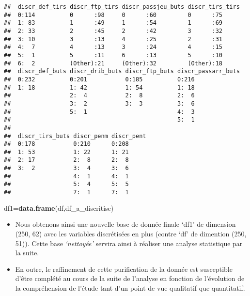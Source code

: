 \documentclass[7pt,]{report}
\newenvironment{Shaded}{\begin{snugshade}}{\end{snugshade}}
\newcommand{\KeywordTok}[1]{\textcolor[rgb]{0.13,0.29,0.53}{\textbf{#1}}}
\newcommand{\NormalTok}[1]{#1}
\begin{document}
\begin{verbatim}
##  discr_def_tirs discr_ftp_tirs discr_passjeu_buts discr_tirs_tirs
##  0:114          0      :98     0      :60         0      :75     
##  1: 83          1      :49     1      :54         1      :69     
##  2: 33          2      :45     2      :42         3      :32     
##  3: 10          3      :13     4      :25         2      :31     
##  4:  7          4      :13     3      :24         4      :15     
##  5:  1          5      :11     6      :13         5      :10     
##  6:  2          (Other):21     (Other):32         (Other):18     
##  discr_def_buts discr_drib_buts discr_ftp_buts discr_passarr_buts
##  0:232          0:201           0:185          0:216             
##  1: 18          1: 42           1: 54          1: 18             
##                 2:  4           2:  8          2:  6             
##                 3:  2           3:  3          3:  6             
##                 5:  1                          4:  3             
##                                                5:  1             
##                                                                  
##  discr_tirs_buts discr_penm discr_pent
##  0:178           0:210      0:208     
##  1: 53           1: 22      1: 21     
##  2: 17           2:  8      2:  8     
##  3:  2           3:  4      3:  6     
##                  4:  1      4:  1     
##                  5:  4      5:  5     
##                  7:  1      7:  1
\end{verbatim}

\begin{Shaded}
\begin{Highlighting}[]
\NormalTok{df1=}\KeywordTok{data.frame}\NormalTok{(df,df_a_discritise)}
\end{Highlighting}
\end{Shaded}

\begin{itemize}
\item
  Nous obtenons ainsi une nouvelle base de donnée finale `df1' de dimension (250, 62) avec les variables discrétisées en plus (contre `df' de dimention (250, 51)). Cette base \emph{`nettoyée'} servira ainsi à réaliser une analyse statistique par la suite.
\item
  En outre, le raffinement de cette purification de la donnée est susceptible d'être complété au cours de la suite de l'analyse en fonction de l'évolution de la compréhension de l'étude tant d'un point de vue qualitatif que quantitatif.
\end{itemize}
\end{document}
